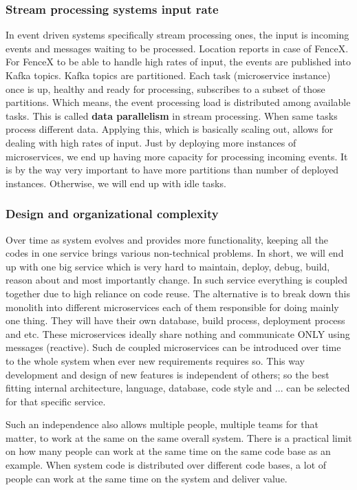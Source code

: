 \documentclass[a4]{report}
\begin{document}
    \subsubsection{Stream processing systems input rate}
    In event driven systems specifically stream processing ones, the input is incoming events and messages waiting to
    be processed.
    Location reports in case of FenceX.
    For FenceX to be able to handle high rates of input, the events are published into Kafka topics.
    Kafka topics are partitioned.
    Each task (microservice instance) once is up, healthy and ready for processing, subscribes to a subset of those
    partitions.
    Which means, the event processing load is distributed among available tasks.
    This is called \textbf{data parallelism} in stream processing.
    When same tasks process different data.
    Applying this, which is basically scaling out, allows for dealing with high rates of input.
    Just by deploying more instances of microservices, we end up having more capacity for processing incoming events.
    It is by the way very important to have more partitions than number of deployed instances.
    Otherwise, we will end up with idle tasks.

    \subsubsection{Design and organizational complexity}
    Over time as system evolves and provides more functionality, keeping all the codes in one service brings various
    non-technical problems.
    In short, we will end up with one big service which is very hard to maintain, deploy, debug, build, reason about
    and most importantly change.
    In such service everything is coupled together due to high reliance on code reuse.
    The alternative is to break down this monolith into different microservices each of them responsible for doing
    mainly one thing.
    They will have their own database, build process, deployment process and etc.
    These microservices ideally share nothing and communicate ONLY using messages (reactive).
    Such de coupled microservices can be introduced over time to the whole system when ever new requirements requires so.
    This way development and design of new features is independent of others;
    so the best fitting internal architecture, language, database, code style and ... can be selected for that specific
    service.

    Such an independence also allows multiple people, multiple teams for that matter, to work at the same on the same
    overall system.
    There is a practical limit on how many people can work at the same time on the same code base as an example.
    When system code is distributed over different code bases, a lot of people can work at the same time on the
    system and deliver value.
\end{document}
